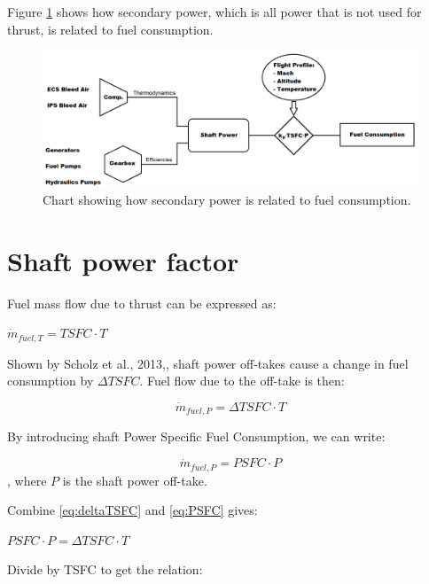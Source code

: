 \documentclass[english]{kththesis}
\begin{document}
Figure \ref{fig:PowerFlow} shows how secondary power, which is all power that is not used for thrust, is related to fuel consumption.

\begin{figure}[h]
    \centering
    \includegraphics[width=1\textwidth]{Epictures/PowerFlow.png}
    \caption{Chart showing how secondary power is related to fuel consumption.}
    \label{fig:PowerFlow}
\end{figure}

\clearpage

\section{Shaft power factor}
\label{sec:ShaftPowerFactor}
Fuel mass flow due to thrust can be expressed as:

\begin{center}
$\dot{m}_{fuel,T} = TSFC \cdot T$
\end{center}

Shown by Scholz et al., 2013,\cite{Scholz2013}, shaft power off-takes cause a change in fuel consumption by $\Delta TSFC$. Fuel flow due to the off-take is then:

\begin{equation}
\label{eq:deltaTSFC}
\dot{m}_{fuel,P} = \Delta TSFC \cdot T
\end{equation}

By introducing shaft Power Specific Fuel Consumption, we can write:

\begin{equation}
\label{eq:PSFC}
\dot{m}_{fuel,P} = PSFC \cdot P
\end{equation}
, where $P$ is the shaft power off-take.

Combine \ref{eq:deltaTSFC} and \ref{eq:PSFC} gives:

\begin{center}
$PSFC \cdot P = \Delta TSFC \cdot T$
\end{center}

Divide by TSFC to get the relation:
\end{document}
